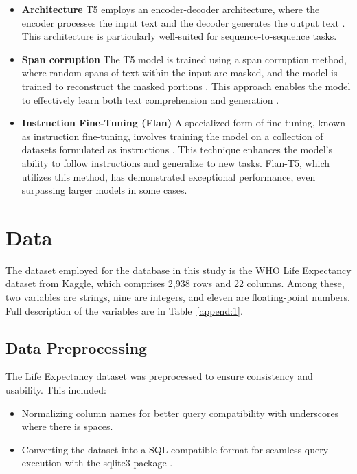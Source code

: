\documentclass[11pt]{article}
\begin{document}
\begin{itemize}

    \item \textbf{Architecture} T5 employs an encoder-decoder architecture, where the encoder processes the input text and the decoder generates the output text \cite{t5scaling}. This architecture is particularly well-suited for sequence-to-sequence tasks.  
    
    \item \textbf{Span corruption} The T5 model is trained using a span corruption method, where random spans of text within the input are masked, and the model is trained to reconstruct the masked portions \cite{dong2016language}. This approach enables the model to effectively learn both text comprehension and generation \cite{t5scaling}.  
    
    \item \textbf{Instruction Fine-Tuning (Flan)} A specialized form of fine-tuning, known as instruction fine-tuning, involves training the model on a collection of datasets formulated as instructions \cite{t5scaling}. This technique enhances the model's ability to follow instructions and generalize to new tasks. Flan-T5, which utilizes this method, has demonstrated exceptional performance, even surpassing larger models in some cases.
\end{itemize}

\section{Data}

The dataset employed for the database in this study is the WHO Life Expectancy dataset \cite{WHOdata} from Kaggle, which comprises 2,938 rows and 22 columns. Among these, two variables are strings, nine are integers, and eleven are floating-point numbers. Full description of the variables are in Table~\ref{append:1}.

\subsection{Data Preprocessing}
The Life Expectancy dataset was preprocessed to ensure consistency and usability. This included:
\begin{itemize}
    \item Normalizing column names for better query compatibility with underscores where there is spaces.
    \item Converting the dataset into a SQL-compatible format for seamless query execution with the sqlite3 package \cite{sqlite}.
\end{itemize}
\end{document}
